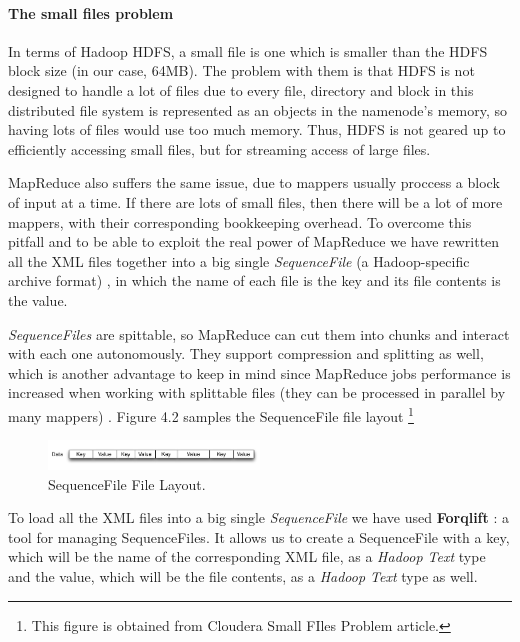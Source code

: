 \paragraph{The small files problem}
In terms of Hadoop HDFS, a small file is one which is smaller than the HDFS block size (in our case, 64MB). The problem with them is that HDFS is not designed to handle a lot of files due to every file, directory and block in this distributed file system is represented as an objects in the namenode's memory, so having lots of files would use too much memory. Thus, HDFS is not geared up to efficiently accessing small files, but for streaming access of large files. 
\par
MapReduce also suffers the same issue, due to mappers usually proccess a block of input at a time. If there are lots of small files, then there will be a lot of more mappers, with their corresponding bookkeeping overhead. To overcome this pitfall and to be able to exploit the real power of MapReduce we have rewritten all the XML files together into a big single \textit{SequenceFile} (a Hadoop-specific archive format) \cite{ApacheHadoopSequenceFile}, in which the name of each file is the key and its file contents is the value. 
\par
\textit{SequenceFiles} are spittable, so MapReduce can cut them into chunks and interact with each one autonomously. They support compression and splitting as well, which is another advantage to keep in mind since MapReduce jobs performance is increased when working with splittable files (they can be processed in parallel by many mappers)  \cite{SmallFiles}. Figure 4.2 samples the SequenceFile file layout \footnote{This figure is obtained from Cloudera Small FIles Problem article.}

\begin{figure}[htb]
\centering
\includegraphics[width=0.5\textwidth]{./images/sequencefile.png}
\caption{SequenceFile File Layout.} \label{fig:sequencefile}
\end{figure}


To load all the XML files into a big single \textit{SequenceFile} we have used \textbf{Forqlift} \cite{Forqlift}: a tool for managing SequenceFiles. It allows us to create a SequenceFile with a key, which will be the name of the corresponding XML file, as a \textit{Hadoop Text} type and the value, which will be the file contents, as a \textit{Hadoop Text} type as well.

